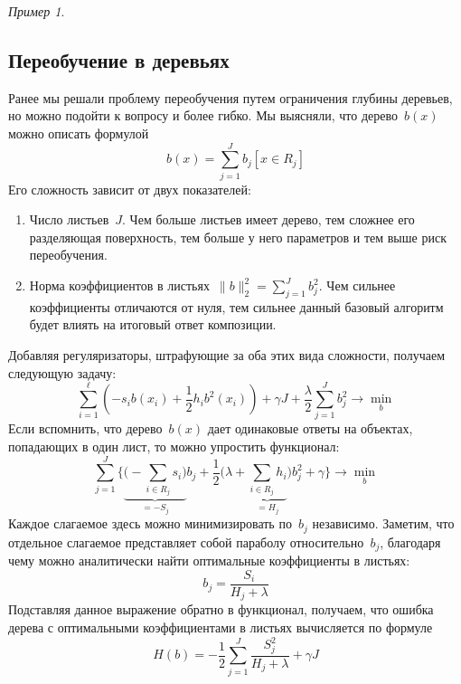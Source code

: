\documentclass[a4paper, 12pt]{article}
\theoremstyle{plain} %
\theoremstyle{definition} %
\theoremstyle{remark} %
\newtheorem{example}{Пример}
\begin{document}
\begin{example}
\subsection{Переобучение в деревьях}

Ранее мы решали проблему переобучения путем ограничения глубины деревьев,
но можно подойти к вопросу и более гибко.
Мы выясняли, что дерево~$b(x)$ можно описать формулой
\[
    b(x)
    =
    \sum_{j = 1}^{J}
        b_{j}
        [x \in R_{j}]
\]
Его сложность зависит от двух показателей:
\begin{enumerate}
    \item Число листьев~$J$. Чем больше листьев имеет дерево, тем сложнее его разделяющая поверхность,
        тем больше у него параметров и тем выше риск переобучения.
    \item Норма коэффициентов в листьях~$\|b\|_2^2 = \sum_{j = 1}^{J} b_j^2$.
        Чем сильнее коэффициенты отличаются от нуля, тем сильнее данный
        базовый алгоритм будет влиять на итоговый ответ композиции.
\end{enumerate}
Добавляя регуляризаторы, штрафующие за оба этих вида сложности, получаем следующую задачу:
\[
    \sum_{i = 1}^{\ell} \left(
        -
        s_i b(x_i)
        +
        \frac12
        h_i b^2(x_i)
    \right)
    +
    \gamma J
    +
    \frac{\lambda}{2}
    \sum_{j = 1}^{J}
        b_j^2
    \to
    \min_{b}
\]
Если вспомнить, что дерево~$b(x)$ дает одинаковые ответы на объектах,
попадающих в один лист, то можно упростить функционал:
\[
    \sum_{j = 1}^{J} \Biggl\{
        \underbrace{
        \Biggl(
            -
            \sum_{i \in R_j} s_i
        \Biggr)
        }_{=-S_j}
        b_j
        +
        \frac12
        \Biggl(
            \lambda
            +
            \underbrace{
            \sum_{i \in R_j} h_i
            }_{=H_j}
        \Biggr)
        b_j^2
        +
        \gamma
    \Biggr\}
    \to
    \min_{b}
\]
Каждое слагаемое здесь можно минимизировать по~$b_j$ независимо.
Заметим, что отдельное слагаемое представляет собой параболу относительно~$b_j$,
благодаря чему можно аналитически найти оптимальные коэффициенты в листьях:
\[
    b_j
    =
    \frac{S_i}{H_j + \lambda}
\]
Подставляя данное выражение обратно в функционал, получаем,
что ошибка дерева с оптимальными коэффициентами в листьях вычисляется по формуле
\begin{equation}
    H(b)
    =
    -
    \frac12
    \sum_{j = 1}^{J}
        \frac{
            S_j^2
        }{
            H_j + \lambda
        }
    +
    \gamma J
\end{equation}


\end{example}
\end{document}
